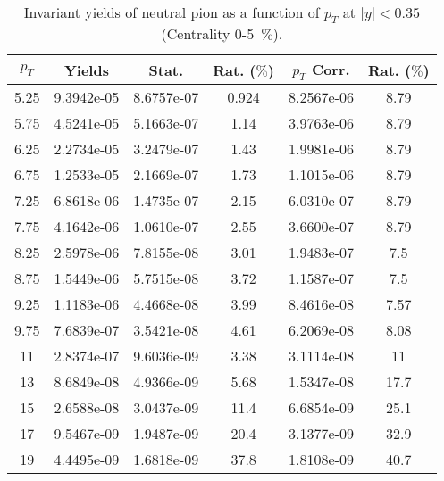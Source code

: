             
\begin{table}[!htb]
\centering
\begin{tabular}{|c|c|c|c|c|c|}
\hline
$p_{T}$ & Yields & Stat. & Rat. ($\%$) & $p_{T}$ Corr. & Rat. ($\%$) \\
\hline
5.25 & 9.3942e-05 & 8.6757e-07 & 0.924 & 8.2567e-06 & 8.79 \\ 
5.75 & 4.5241e-05 & 5.1663e-07 & 1.14 & 3.9763e-06 & 8.79 \\ 
6.25 & 2.2734e-05 & 3.2479e-07 & 1.43 & 1.9981e-06 & 8.79 \\ 
6.75 & 1.2533e-05 & 2.1669e-07 & 1.73 & 1.1015e-06 & 8.79 \\ 
7.25 & 6.8618e-06 & 1.4735e-07 & 2.15 & 6.0310e-07 & 8.79 \\ 
7.75 & 4.1642e-06 & 1.0610e-07 & 2.55 & 3.6600e-07 & 8.79 \\ 
8.25 & 2.5978e-06 & 7.8155e-08 & 3.01 & 1.9483e-07 & 7.5 \\ 
8.75 & 1.5449e-06 & 5.7515e-08 & 3.72 & 1.1587e-07 & 7.5 \\ 
9.25 & 1.1183e-06 & 4.4668e-08 & 3.99 & 8.4616e-08 & 7.57 \\ 
9.75 & 7.6839e-07 & 3.5421e-08 & 4.61 & 6.2069e-08 & 8.08 \\ 
11 & 2.8374e-07 & 9.6036e-09 & 3.38 & 3.1114e-08 & 11 \\ 
13 & 8.6849e-08 & 4.9366e-09 & 5.68 & 1.5347e-08 & 17.7 \\ 
15 & 2.6588e-08 & 3.0437e-09 & 11.4 & 6.6854e-09 & 25.1 \\ 
17 & 9.5467e-09 & 1.9487e-09 & 20.4 & 3.1377e-09 & 32.9 \\ 
19 & 4.4495e-09 & 1.6818e-09 & 37.8 & 1.8108e-09 & 40.7 \\ 
\hline
\end{tabular}
\caption{Invariant yields of neutral pion as a function of $p_{T}$ at $|y|<0.35$ (Centrality 0-5~$\%$).}
\end{table}
            
            
